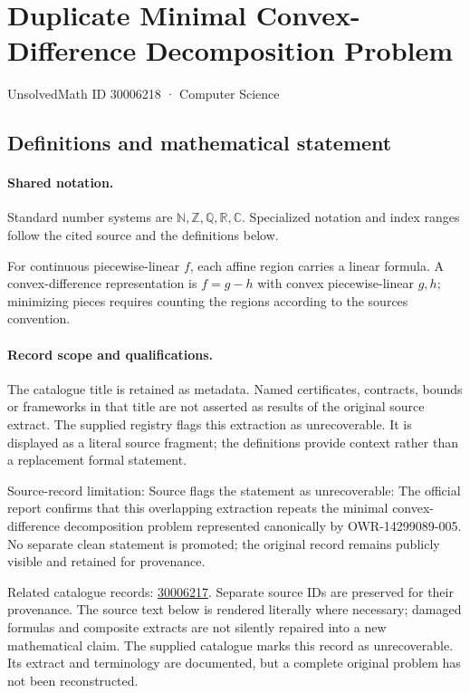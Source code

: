 \documentclass[11pt]{article}
\begin{document}
\setcounter{section}{30006217}
\section{Duplicate Minimal Convex-Difference Decomposition Problem}\label{30006218}
{\small\sffamily UnsolvedMath ID 30006218 · Computer Science}
\subsection{Definitions and mathematical statement}

\paragraph{Shared notation.}Standard number systems are $\mathbb N,\mathbb Z,\mathbb Q,\mathbb R,\mathbb C$. Specialized notation and index ranges follow the cited source and the definitions below.


For continuous piecewise-linear $f$, each affine region carries a linear formula. A convex-difference representation is $f=g-h$ with convex piecewise-linear $g,h$; minimizing pieces requires counting the regions according to the source\textquotesingle s convention.
\paragraph{Record scope and qualifications.}
The catalogue title is retained as metadata. Named certificates, contracts, bounds or frameworks in that title are not asserted as results of the original source extract.
The supplied registry flags this extraction as unrecoverable. It is displayed as a literal source fragment; the definitions provide context rather than a replacement formal statement.

Source-record limitation: Source flags the statement as unrecoverable: The official report confirms that this overlapping extraction repeats the minimal convex-difference decomposition problem represented canonically by OWR-14299089-005. No separate clean statement is promoted; the original record remains publicly visible and retained for provenance.

Related catalogue records: \href{https://mehmetmars7.github.io/Erdosproblems-llm-hunter/problem.html?type=open_problems&id=30006217}{30006217}. Separate source IDs are preserved for their provenance.
The source text below is rendered literally where necessary; damaged formulas and composite extracts are not silently repaired into a new mathematical claim.
The supplied catalogue marks this record as unrecoverable. Its extract and terminology are documented, but a complete original problem has not been reconstructed.
\end{document}
